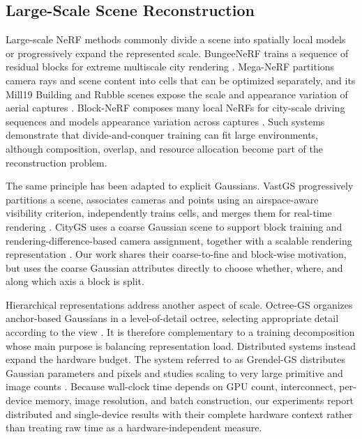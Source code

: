 \documentclass[conference]{IEEEtran}
\begin{document}
\subsection{Large-Scale Scene Reconstruction}

Large-scale NeRF methods commonly divide a scene into spatially local models or progressively expand the represented scale. BungeeNeRF trains a sequence of residual blocks for extreme multiscale city rendering \cite{xiangli2022bungeenerf}. Mega-NeRF partitions camera rays and scene content into cells that can be optimized separately, and its Mill19 Building and Rubble scenes expose the scale and appearance variation of aerial captures \cite{turki2022meganerf}. Block-NeRF composes many local NeRFs for city-scale driving sequences and models appearance variation across captures \cite{tancik2022blocknerf}. Such systems demonstrate that divide-and-conquer training can fit large environments, although composition, overlap, and resource allocation become part of the reconstruction problem.

The same principle has been adapted to explicit Gaussians. VastGS progressively partitions a scene, associates cameras and points using an airspace-aware visibility criterion, independently trains cells, and merges them for real-time rendering \cite{lin2024vastgaussian}. CityGS uses a coarse Gaussian scene to support block training and rendering-difference-based camera assignment, together with a scalable rendering representation \cite{liu2024citygaussian}. Our work shares their coarse-to-fine and block-wise motivation, but uses the coarse Gaussian attributes directly to choose whether, where, and along which axis a block is split.

Hierarchical representations address another aspect of scale. Octree-GS organizes anchor-based Gaussians in a level-of-detail octree, selecting appropriate detail according to the view \cite{ren2024octreegs}. It is therefore complementary to a training decomposition whose main purpose is balancing representation load. Distributed systems instead expand the hardware budget. The system referred to as Grendel-GS distributes Gaussian parameters and pixels and studies scaling to very large primitive and image counts \cite{zhao2025scaling3dgs}. Because wall-clock time depends on GPU count, interconnect, per-device memory, image resolution, and batch construction, our experiments report distributed and single-device results with their complete hardware context rather than treating raw time as a hardware-independent measure.
\end{document}
